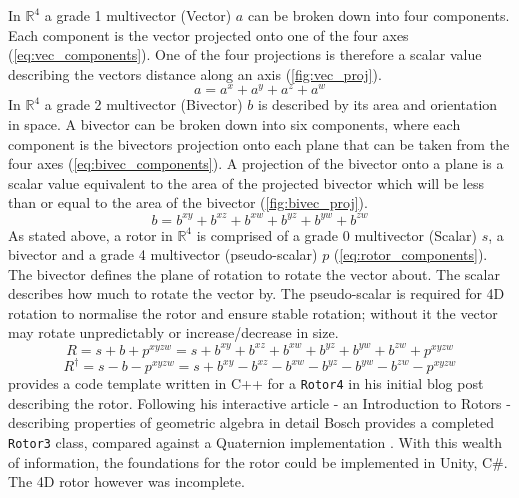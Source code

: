 \documentclass{l4proj}
\begin{document}
In $\mathbb{R}^4$ a grade 1 multivector (Vector) \(a\) can be broken down into four components. Each component is the vector projected onto one of the four axes (\cref{eq:vec_components}). One of the four projections is therefore a scalar value describing the vectors distance along an axis (\cref{fig:vec_proj}).
%
\begin{equation}
  \label{eq:vec_components}
  a = a^x + a^y + a^z + a^w
\end{equation}
%
In $\mathbb{R}^4$ a grade 2 multivector (Bivector) \(b\) is described by its area and orientation in space. A bivector can be broken down into six components, where each component is the bivectors projection onto each plane that can be taken from the four axes (\cref{eq:bivec_components}). A projection of the bivector onto a plane is a scalar value equivalent to the area of the projected bivector which will be less than or equal to the area of the bivector (\cref{fig:bivec_proj}).
%
\begin{equation}
  \label{eq:bivec_components}
  b = b^{xy} + b^{xz} + b^{xw} + b^{yz} + b^{yw} + b^{zw}
\end{equation}
%
As stated above, a rotor in $\mathbb{R}^4$ is comprised of a grade 0 multivector (Scalar) \(s\), a bivector and a grade 4 multivector (pseudo-scalar) \(p\) (\cref{eq:rotor_components}). The bivector defines the plane of rotation to rotate the vector about. The scalar describes how much to rotate the vector by. The pseudo-scalar is required for 4D rotation to normalise the rotor and ensure stable rotation; without it the vector may rotate unpredictably or increase/decrease in size.
%
\begin{equation}
  \label{eq:rotor_components}
  R = s + b + p^{xyzw} = 
  s + b^{xy} + b^{xz} + b^{xw} + b^{yz} + b^{yw} + b^{zw} + p^{xyzw}
\end{equation}
%
\begin{equation}
  \label{eq:rotor_rev}
  R^{\dagger} = s - b - p^{xyzw} = 
  s + b^{xy} - b^{xz} - b^{xw} - b^{yz} - b^{yw} - b^{zw} - p^{xyzw}
\end{equation}
%
\citet{bosch_4d_2011} provides a code template written in C++ for a \texttt{Rotor4} in his initial blog post describing the rotor. Following his interactive article - an Introduction to Rotors - describing properties of geometric algebra in detail \citep{bosch_lets_nodate} Bosch provides a completed \texttt{Rotor3} class, compared against a Quaternion implementation \citep{bosch_code_nodate}. With this wealth of information, the foundations for the rotor could be implemented in Unity, C\#. The 4D rotor however was incomplete. 
\end{document}
